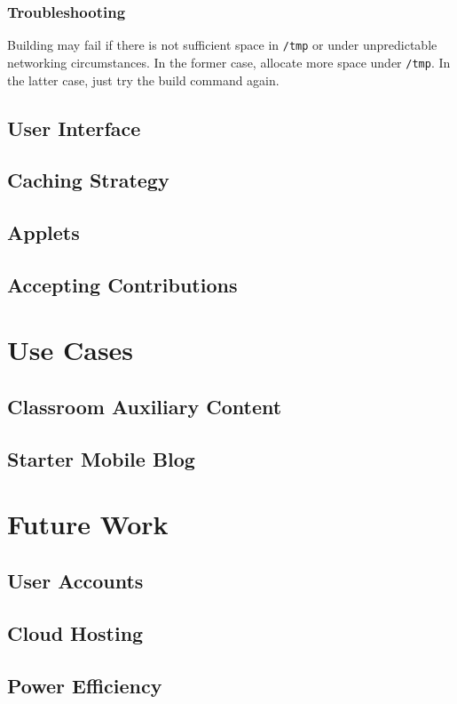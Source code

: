 \documentclass[12pt]{report}
\begin{document}
        \subsection{Troubleshooting}

Building may fail if there is not sufficient space in \texttt{/tmp} or under
unpredictable networking circumstances. In the former case, allocate more space
under \texttt{/tmp}. In the latter case, just try the build command again.

    \section{User Interface}
    \section{Caching Strategy}
    \section{Applets}
    \section{Accepting Contributions}

\chapter{Use Cases}
    \section{Classroom Auxiliary Content}
    \section{Starter Mobile Blog}

\chapter{Future Work}
    \section{User Accounts}
    \section{Cloud Hosting}
    \section{Power Efficiency}
\end{document}
